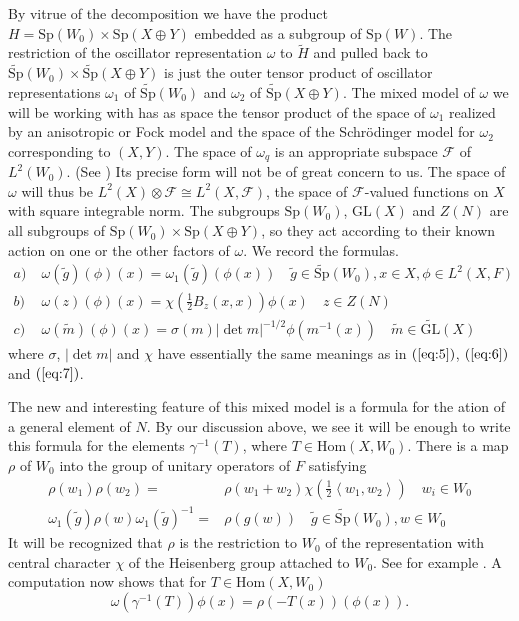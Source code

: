 \documentclass[12pt]{amsart}
\def\inn#1#2{\left\langle{#1},{#2}\right\rangle}
\def\abs#1{\left|{#1}\right|}
\def\Sp{{\mathrm{Sp}}}
\def\tSp{{\widetilde{\mathrm{Sp}}}}
\def\GL{{\mathrm{GL}}}
\def\tGL{{\widetilde{\mathrm{GL}}}}
\def\Hom{{\mathrm{Hom}}}
\def\tg{{\widetilde{g}}}
\def\tm{{\widetilde{m}}}
\def\tH{{\widetilde{H}}}
\def\cff{{\mathcal{F}}}
\begin{document}
By vitrue of the decomposition we have the product 
$H=\Sp(W_0)\times \Sp(X\oplus Y)$ embedded as a subgroup 
of $\Sp(W)$. The restriction of the oscillator representation 
$\omega$ to $\tH$ and pulled back to $\tSp(W_0)\times \tSp(X\oplus Y)$
is just the outer tensor product of oscillator representations $\omega_1$
of $\tSp(W_0)$ and $\omega_2$ of $\tSp(X\oplus Y)$. The mixed model 
of $\omega$ we will be working 
with has as space the tensor product of the space of $\omega_1$ realized by 
an anisotropic or Fock model and the space of the Schr\"odinger model 
for $\omega_2$ corresponding to $(X,Y)$. 
The space of $\omega_q$ is an appropriate subspace $\cff$ of $L^2(W_0)$. 
(See \cite{HoweOsc2}) Its precise form will not be of great concern to us. 
The space of $\omega$ will thus be $L^2(X)\otimes \cff \cong L^2(X,\cff)$, 
the space of $\cff$-valued functions on $X$ with square integrable norm. 
The subgroups $\Sp(W_0)$, $\GL(X)$ and $Z(N)$ are all subgroups
of $\Sp(W_0)\times \Sp(X\oplus Y)$, so they act according to their
known action on one or the other factors of $\omega$. 
We record the formulas.
\begin{equation}\label{eq:17}
\begin{split}
a)\; & \omega(\tg)(\phi)(x)=\omega_1(\tg)(\phi(x))\quad \tg\in \tSp(W_0), 
x\in X, \phi\in L^2(X,F)\\
b)\; & \omega(z)(\phi)(x) = \chi(\frac{1}{2}B_z(x,x))\phi(x)\quad z\in Z(N)\\
c)\; & \omega(\tm)(\phi)(x) = \sigma(m)\abs{\det m}^{-1/2}\phi(m^{-1}(x))
\quad \tm\in \tGL(X)
\end{split}
\end{equation}
where $\sigma$, $\abs{\det m}$ and $\chi$ have essentially the same 
meanings as in $(\ref{eq:5})$, $(\ref{eq:6})$ and $(\ref{eq:7})$.

The new and interesting feature of this mixed model is a formula for 
the ation of a general element of $N$. By our discussion above, 
we see it will be enough to write this formula for the 
elements $\gamma^{-1}(T)$, where $T\in \Hom(X,W_0)$. 
There is a map $\rho$ of $W_0$ into the group of unitary operators of $F$ 
satisfying
\begin{equation}\label{eq:18}
\begin{split}
\rho(w_1)\rho(w_2)=&\rho(w_1+w_2)\chi(\frac{1}{2}\inn{w_1}{w_2}) 
\quad w_i \in W_0\\
\omega_1(\tg)\rho(w)\omega_1(\tg)^{-1} =& \rho(g(w))\quad \tg \in \tSp(W_0), 
w\in W_0
\end{split}
\end{equation}
It will be recognized that $\rho$ is the restriction to $W_0$ of
the representation with central character $\chi$ of the Heisenberg group
attached to $W_0$. 
See for example \cite{Howe1979}. A computation now shows that for 
$T\in \Hom(X,W_0)$
\begin{equation}\label{eq:19}
\omega(\gamma^{-1}(T))\phi(x) = \rho(-T(x))(\phi(x)).
\end{equation}
\end{document}
